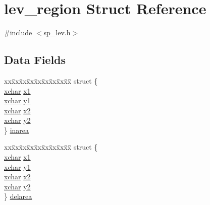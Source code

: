 \hypertarget{structlev__region}{\section{lev\+\_\+region Struct Reference}
\label{structlev__region}
}


{\ttfamily \#include $<$sp\+\_\+lev.\+h$>$}

\subsection*{Data Fields}
\begin{DoxyCompactItemize}
\item 
\begin{tabbing}
xx\=xx\=xx\=xx\=xx\=xx\=xx\=xx\=xx\=\kill
struct \{\\
\>\hyperlink{global_8h_a2043b7d01ce89f4ee2fa6c345a752d32}{xchar} \hyperlink{structlev__region_af8f82a8cbbd45def87d2d011f90ba84c}{x1}\\
\>\hyperlink{global_8h_a2043b7d01ce89f4ee2fa6c345a752d32}{xchar} \hyperlink{structlev__region_a518d0af0a741147e9cd90704020f4067}{y1}\\
\>\hyperlink{global_8h_a2043b7d01ce89f4ee2fa6c345a752d32}{xchar} \hyperlink{structlev__region_aa2cd141352fa638ca035a3336943c568}{x2}\\
\>\hyperlink{global_8h_a2043b7d01ce89f4ee2fa6c345a752d32}{xchar} \hyperlink{structlev__region_a6a7635569e2568f1c75e97ff9db7f655}{y2}\\
\} \hyperlink{structlev__region_ae7cf45ca96c972e2dc4821fec42896ad}{inarea}\\

\end{tabbing}\item 
\begin{tabbing}
xx\=xx\=xx\=xx\=xx\=xx\=xx\=xx\=xx\=\kill
struct \{\\
\>\hyperlink{global_8h_a2043b7d01ce89f4ee2fa6c345a752d32}{xchar} \hyperlink{structlev__region_af8f82a8cbbd45def87d2d011f90ba84c}{x1}\\
\>\hyperlink{global_8h_a2043b7d01ce89f4ee2fa6c345a752d32}{xchar} \hyperlink{structlev__region_a518d0af0a741147e9cd90704020f4067}{y1}\\
\>\hyperlink{global_8h_a2043b7d01ce89f4ee2fa6c345a752d32}{xchar} \hyperlink{structlev__region_aa2cd141352fa638ca035a3336943c568}{x2}\\
\>\hyperlink{global_8h_a2043b7d01ce89f4ee2fa6c345a752d32}{xchar} \hyperlink{structlev__region_a6a7635569e2568f1c75e97ff9db7f655}{y2}\\
\} \hyperlink{structlev__region_abc20c12592d79932eb0140707d140671}{delarea}\\


\end{tabbing}
\end{DoxyCompactItemize}
